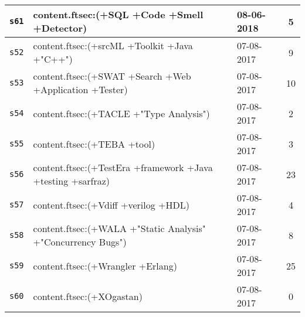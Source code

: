 \begin{longtable}{| l | p{13cm} | l | c |}
    \hline
\texttt{s61} & content.ftsec:(+SQL +Code +Smell +Detector) & 08-06-2018 & 5 \\
    \hline
\texttt{s52} & content.ftsec:(+srcML +Toolkit +Java +"C++") & 07-08-2017 & 9 \\
    \hline
\texttt{s53} & content.ftsec:(+SWAT +Search +Web +Application +Tester) & 07-08-2017 & 10 \\
    \hline
\texttt{s54} & content.ftsec:(+TACLE +"Type Analysis") & 07-08-2017 & 2 \\
    \hline
\texttt{s55} & content.ftsec:(+TEBA +tool) & 07-08-2017 & 3 \\
    \hline
\texttt{s56} & content.ftsec:(+TestEra +framework +Java +testing +sarfraz) & 07-08-2017 & 23 \\
    \hline
\texttt{s57} & content.ftsec:(+Vdiff +verilog +HDL) & 07-08-2017 & 4 \\
    \hline
\texttt{s58} & content.ftsec:(+WALA +"Static Analysis" +"Concurrency Bugs") & 07-08-2017 & 8 \\
    \hline
\texttt{s59} & content.ftsec:(+Wrangler +Erlang) & 07-08-2017 & 25 \\
    \hline
\texttt{s60} & content.ftsec:(+XOgastan) & 07-08-2017 & 0 \\
    \hline
  \hline
\end{longtable}

